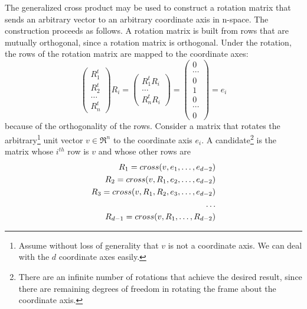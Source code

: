 \documentclass[10pt]{article}
\begin{document}

The generalized cross product may be used to construct a rotation matrix
that sends an arbitrary vector to an arbitrary coordinate axis in n-space.
The construction proceeds as follows.
A rotation matrix is built from rows that are mutually orthogonal,
since a rotation matrix is orthogonal.
Under the rotation, 
the rows of the rotation matrix are mapped to the coordinate axes:
\[
\left(
\begin{array}{c}
R_1^t \\ R_2^t \\ \ldots \\ R_n^t
\end{array}
\right)
R_i
= 
\left(
\begin{array}{c}
R_1^t R_i \\ \ldots \\ R_n^t R_i
\end{array}
\right)
=
\left(
\begin{array}{c}
0 \\ \cdots \\ 0 \\ 1 \\ 0 \\ \cdots \\ 0
\end{array}
\right)
=
e_i
\]
because of the orthogonality of the rows.
Consider a matrix that rotates the arbitrary\footnote{Assume without loss of 
      generality that $v$ is not a coordinate axis.
      We can deal with the $d$ coordinate axes easily.} 
unit vector $v \in \Re^n$ to the coordinate axis $e_i$.
A candidate\footnote{There are an infinite number
  of rotations that achieve the desired result, 
  since there are remaining degrees of freedom in rotating
  the frame about the coordinate axis.} 
is the matrix whose $i^{th}$ row is $v$ and whose other rows are
\begin{eqnarray}
\label{eqn:R1}
R_1 = cross (v,e_1,         \ldots,e_{d-2}) \\
R_2 = cross (v,R_1,e_2,     \ldots,e_{d-2}) \\
R_3 = cross (v,R_1,R_2,e_3, \ldots,e_{d-2}) \\
\ldots \hfill \\
\label{eqn:Rlast}
R_{d-1} = cross (v,R_1,\ldots,R_{d-2})
\end{eqnarray}
\end{document}
